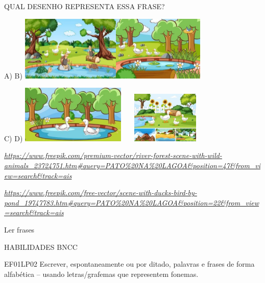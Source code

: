 \begin{escola}
QUAL DESENHO REPRESENTA ESSA FRASE?

A) B)
\includegraphics[width=1.85903in,height=1.21806in]{media/image250.jpg}\includegraphics[width=1.71806in,height=1.21875in]{media/image251.jpg}

C) D)
\includegraphics[width=1.96319in,height=1.09028in]{media/image252.jpg}\includegraphics[width=1.78681in,height=0.96806in]{media/image253.jpg}

\href{https://www.freepik.com/premium-vector/river-forest-scene-with-wild-animals_23724751.htm\#query=PATO\%20NA\%20LAGOA\&position=47\&from_view=search\&track=ais}{\emph{https://www.freepik.com/premium-vector/river-forest-scene-with-wild-animals\_23724751.htm\#query=PATO\%20NA\%20LAGOA\&position=47\&from\_view=search\&track=ais}}

\href{https://www.freepik.com/free-vector/scene-with-ducks-bird-by-pond_19747783.htm\#query=PATO\%20NA\%20LAGOA\&position=22\&from_view=search\&track=ais}{\emph{https://www.freepik.com/free-vector/scene-with-ducks-bird-by-pond\_19747783.htm\#query=PATO\%20NA\%20LAGOA\&position=22\&from\_view=search\&track=ais}}

Ler frases

HABILIDADES BNCC

EF01LP02 Escrever, espontaneamente ou por ditado, palavras e frases de
forma alfabética -- usando letras/grafemas que representem fonemas.


\end{escola}
